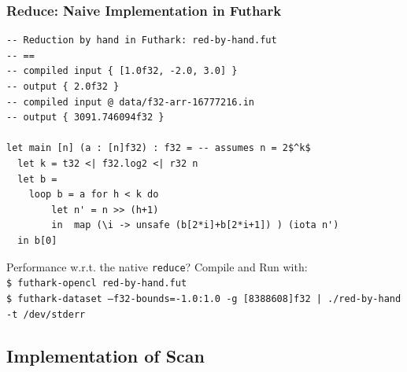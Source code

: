 \documentclass{beamer}
\begin{document}
\begin{frame}[fragile,t]
  \frametitle{Reduce: Naive Implementation in Futhark}

\begin{lstlisting}[mathescape=true]
-- Reduction by hand in Futhark: red-by-hand.fut
-- ==
-- compiled input { [1.0f32, -2.0, 3.0] }
-- output { 2.0f32 }
-- compiled input @ data/f32-arr-16777216.in
-- output { 3091.746094f32 }

let main [n] (a : [n]f32) : f32 = -- assumes n = 2$^k$
  let k = t32 <| f32.log2 <| r32 n
  let b = 
    loop b = a for h < k do
        let n' = n >> (h+1)
        in  map (\i -> unsafe (b[2*i]+b[2*i+1]) ) (iota n')
  in b[0]
\end{lstlisting}

\alert{Performance w.r.t. the native {\tt reduce}?} Compile and Run with:\\
{\tt\$ futhark-opencl red-by-hand.fut}\\
{\tt\$ futhark-dataset --f32-bounds=-1.0:1.0 -g [8388608]f32 | ./red-by-hand -t /dev/stderr}
\end{frame}


\subsection{Implementation of Scan}

\begin{frame}[fragile]
	\tableofcontents[currentsubsection]
\end{frame}
\end{document}
